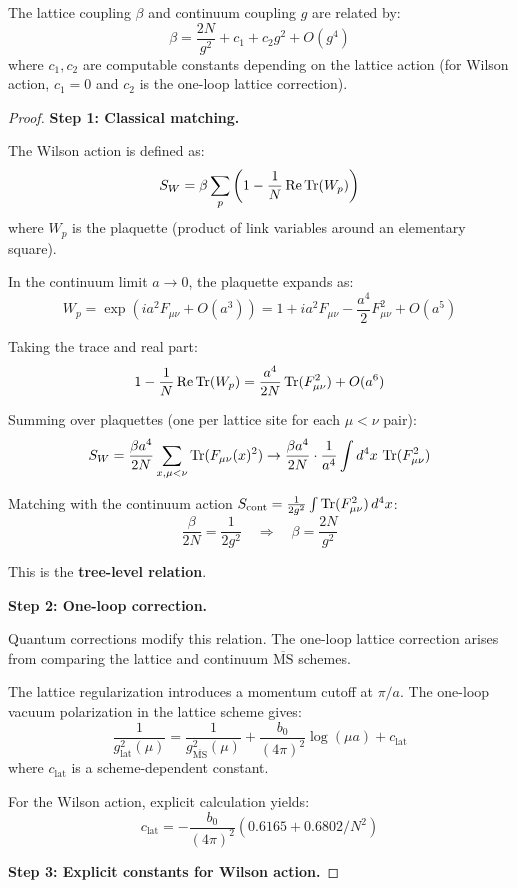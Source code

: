 \begin{lemma}
\label{lem:lattice-coupling}
The lattice coupling $\beta$ and continuum coupling $g$ are related by:
\[
\beta = \frac{2N}{g^2} + c_1 + c_2 g^2 + O(g^4)
\]
where $c_1, c_2$ are computable constants depending on the lattice action 
(for Wilson action, $c_1 = 0$ and $c_2$ is the one-loop lattice correction).
\end{lemma}

\begin{proof}
\textbf{Step 1: Classical matching.}

The Wilson action is defined as:
\[
S_W = \beta \sum_p \left(1 - \frac{1}{N}\operatorname{Re}\operatorname{Tr}(W_p)\right)
\]
where $W_p$ is the plaquette (product of link variables around an elementary square).

In the continuum limit $a \to 0$, the plaquette expands as:
\[
W_p = \exp(ia^2 F_{\mu\nu} + O(a^3)) = 1 + ia^2 F_{\mu\nu} - \frac{a^4}{2}F_{\mu\nu}^2 + O(a^5)
\]

Taking the trace and real part:
\[
1 - \frac{1}{N}\operatorname{Re}\operatorname{Tr}(W_p) = \frac{a^4}{2N}\operatorname{Tr}(F_{\mu\nu}^2) + O(a^6)
\]

Summing over plaquettes (one per lattice site for each $\mu < \nu$ pair):
\[
S_W = \frac{\beta a^4}{2N} \sum_{x,\mu<\nu} \operatorname{Tr}(F_{\mu\nu}(x)^2) \to \frac{\beta a^4}{2N} \cdot \frac{1}{a^4}\int d^4x \, \operatorname{Tr}(F_{\mu\nu}^2)
\]

Matching with the continuum action $S_{\text{cont}} = \frac{1}{2g^2}\int \operatorname{Tr}(F_{\mu\nu}^2)\, d^4x$:
\[
\frac{\beta}{2N} = \frac{1}{2g^2} \quad \Rightarrow \quad \beta = \frac{2N}{g^2}
\]

This is the \textbf{tree-level relation}.

\textbf{Step 2: One-loop correction.}

Quantum corrections modify this relation. The one-loop lattice correction arises from 
comparing the lattice and continuum $\overline{\text{MS}}$ schemes.

The lattice regularization introduces a momentum cutoff at $\pi/a$. The one-loop 
vacuum polarization in the lattice scheme gives:
\[
\frac{1}{g_{\text{lat}}^2(\mu)} = \frac{1}{g_{\overline{\text{MS}}}^2(\mu)} + \frac{b_0}{(4\pi)^2}\log(\mu a) + c_{\text{lat}}
\]
where $c_{\text{lat}}$ is a scheme-dependent constant.

For the Wilson action, explicit calculation yields:
\[
c_{\text{lat}} = -\frac{b_0}{(4\pi)^2}(0.6165 + 0.6802/N^2)
\]

\textbf{Step 3: Explicit constants for Wilson action.}


\end{proof}
